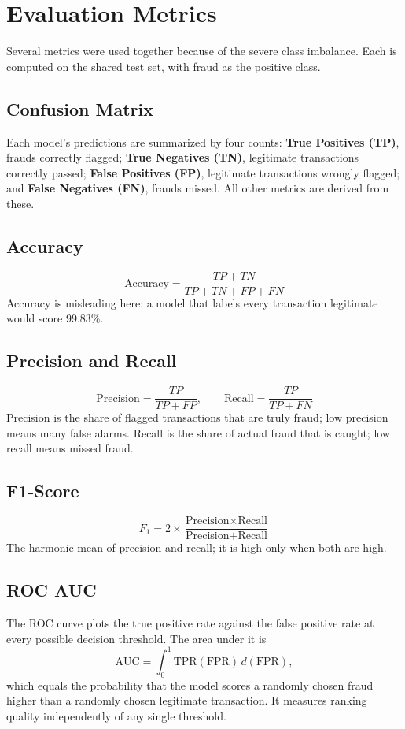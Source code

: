 \documentclass[journal]{IEEEtran}
\begin{document}
\section{Evaluation Metrics}
Several metrics were used together because of the severe class imbalance. Each is computed on the shared test set, with fraud as the positive class.

\subsection{Confusion Matrix}
Each model's predictions are summarized by four counts: \textbf{True Positives (TP)}, frauds correctly flagged; \textbf{True Negatives (TN)}, legitimate transactions correctly passed; \textbf{False Positives (FP)}, legitimate transactions wrongly flagged; and \textbf{False Negatives (FN)}, frauds missed. All other metrics are derived from these.

\subsection{Accuracy}
\begin{equation}
\text{Accuracy} = \frac{TP + TN}{TP + TN + FP + FN}
\end{equation}
Accuracy is misleading here: a model that labels every transaction legitimate would score 99.83\%.

\subsection{Precision and Recall}
\begin{equation}
\text{Precision} = \frac{TP}{TP + FP}, \qquad \text{Recall} = \frac{TP}{TP + FN}
\end{equation}
Precision is the share of flagged transactions that are truly fraud; low precision means many false alarms. Recall is the share of actual fraud that is caught; low recall means missed fraud.

\subsection{F1-Score}
\begin{equation}
F_1 = 2 \times \frac{\text{Precision} \times \text{Recall}}{\text{Precision} + \text{Recall}}
\end{equation}
The harmonic mean of precision and recall; it is high only when both are high.

\subsection{ROC AUC}
The ROC curve plots the true positive rate against the false positive rate at every possible decision threshold. The area under it is
\begin{equation}
\text{AUC} = \int_0^1 \text{TPR}(\text{FPR}) \, d(\text{FPR}),
\end{equation}
which equals the probability that the model scores a randomly chosen fraud higher than a randomly chosen legitimate transaction. It measures ranking quality independently of any single threshold.
\end{document}
